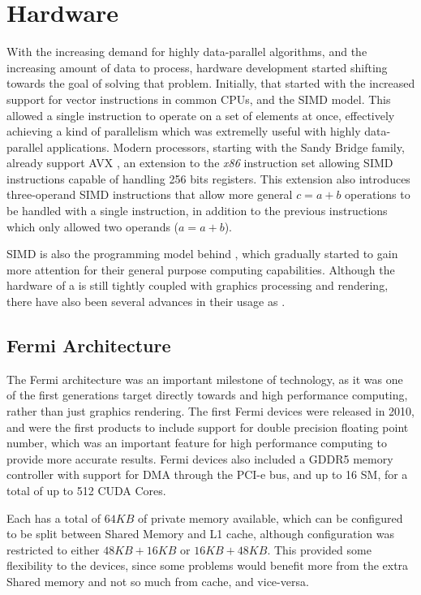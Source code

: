 \documentclass[main.tex]{subfiles}
\begin{document}
\section{Hardware}

With the increasing demand for highly data-parallel algorithms, and the increasing amount of data to process, hardware development started shifting towards the goal of solving that problem. Initially, that started with the increased support for vector instructions in common \acsp{CPU}, and the \acs{SIMD} model. This allowed a single instruction to operate on a set of elements at once, effectively achieving a kind of parallelism which was extremelly useful with highly data-parallel applications. Modern \intel processors, starting with the Sandy Bridge family, already support \ac{AVX} , an extension to the \textit{x86} instruction set allowing \acs{SIMD} instructions capable of handling 256 bits registers. This extension also introduces three-operand \acs{SIMD} instructions that allow more general $c = a + b$ operations to be handled with a single instruction, in addition to the previous instructions which only allowed two operands ($a = a + b$).

\acs{SIMD} is also the programming model behind \gpus, which gradually started to gain more attention for their general purpose computing capabilities. Although the hardware of a \gpus is still tightly coupled with graphics processing and rendering, there have also been several advances in their usage as \gpgpus.


\subsection{\nvidia Fermi Architecture}

The Fermi architecture was an important milestone of \gpus technology, as it was one of the first generations target directly towards \gpgpu and high performance computing, rather than just graphics rendering. The first Fermi devices were released in 2010, and were the first \nvidia products to include support for double precision floating point number, which was an important feature for high performance computing to provide more accurate results. Fermi devices also included a GDDR5 memory controller with support for \ac{DMA} through the \acs{PCI-e} bus, and up to 16 \acf{SM}, for a total of up to 512 \acs{CUDA} Cores.

Each \sm has a total of $64KB$ of private memory available, which can be configured to be split between Shared Memory and L1 cache, although configuration was restricted to either $48KB + 16KB$ or $16KB + 48KB$. This provided some flexibility to the devices, since some problems would benefit more from the extra Shared memory and not so much from cache, and vice-versa.
\end{document}
